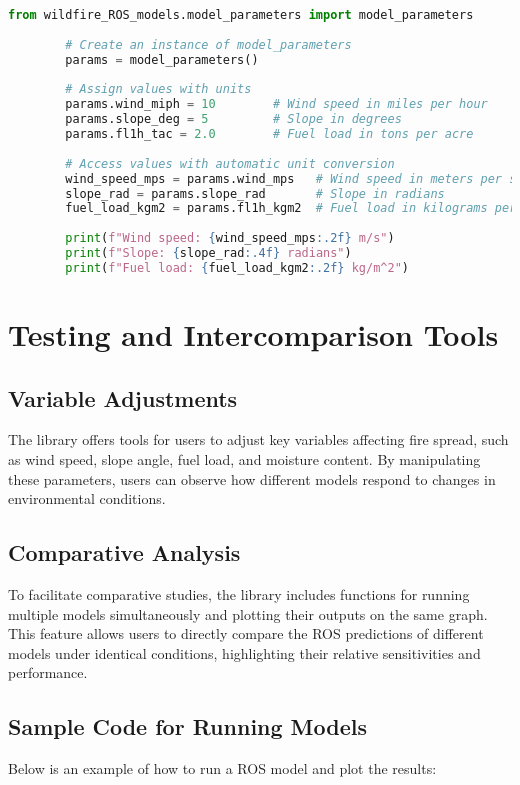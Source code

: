 \documentclass{article}
\begin{document}
	\begin{lstlisting}[language=Python, caption=Using the model\_parameters class]
		from wildfire_ROS_models.model_parameters import model_parameters
		
		# Create an instance of model_parameters
		params = model_parameters()
		
		# Assign values with units
		params.wind_miph = 10        # Wind speed in miles per hour
		params.slope_deg = 5         # Slope in degrees
		params.fl1h_tac = 2.0        # Fuel load in tons per acre
		
		# Access values with automatic unit conversion
		wind_speed_mps = params.wind_mps   # Wind speed in meters per second
		slope_rad = params.slope_rad       # Slope in radians
		fuel_load_kgm2 = params.fl1h_kgm2  # Fuel load in kilograms per square meter
		
		print(f"Wind speed: {wind_speed_mps:.2f} m/s")
		print(f"Slope: {slope_rad:.4f} radians")
		print(f"Fuel load: {fuel_load_kgm2:.2f} kg/m^2")
	\end{lstlisting}
	
	\section{Testing and Intercomparison Tools}
	\subsection{Variable Adjustments}
	The library offers tools for users to adjust key variables affecting fire spread, such as wind speed, slope angle, fuel load, and moisture content. By manipulating these parameters, users can observe how different models respond to changes in environmental conditions.
	
	\subsection{Comparative Analysis}
	To facilitate comparative studies, the library includes functions for running multiple models simultaneously and plotting their outputs on the same graph. This feature allows users to directly compare the ROS predictions of different models under identical conditions, highlighting their relative sensitivities and performance.
	
	\subsection{Sample Code for Running Models}
	Below is an example of how to run a ROS model and plot the results:
	
\end{document}
